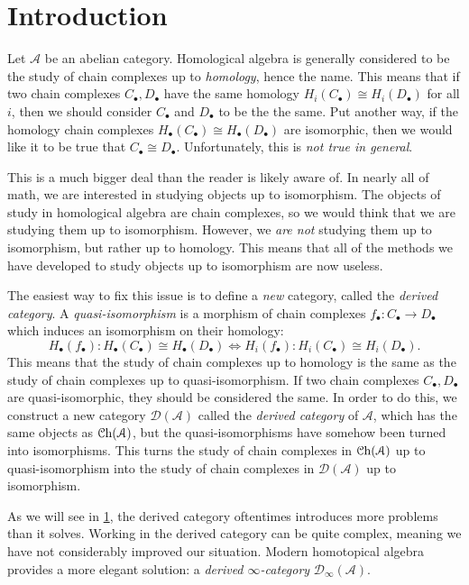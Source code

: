 \section{Introduction}\label{sec2}

Let $\mathcal{A} $ be an abelian category. Homological algebra is generally considered to be the study of chain complexes up to \emph{homology}, hence the name. This means that if two chain complexes $C_{\bullet} ,D_{\bullet} $ have the same homology $H_i(C_{\bullet} )\cong H_i(D_{\bullet} )$ for all $i$, then we should consider $C_{\bullet} $ and $D_{\bullet} $ to be the the same. Put another way, if the homology chain complexes $H_{\bullet} (C_{\bullet} )\cong H_{\bullet} (D_{\bullet} )$ are isomorphic, then we would like it to be true that $C_{\bullet} \cong D_{\bullet} $. Unfortunately, this is \emph{not true in general}.

This is a much bigger deal than the reader is likely aware of. In nearly all of math, we are interested in studying objects up to isomorphism. The objects of study in homological algebra are chain complexes, so we would think that we are studying them up to isomorphism. However, we \emph{are not} studying them up to isomorphism, but rather up to homology. This means that all of the methods we have developed to study objects up to isomorphism are now useless.

The easiest way to fix this issue is to define a \emph{new} category, called the \emph{derived category}. A \emph{quasi-isomorphism} is a morphism of chain complexes $f_{\bullet} : C_{\bullet}  \to D_{\bullet} $ which induces an isomorphism on their homology:
\[
	H_{\bullet} (f_{\bullet} ): H_{\bullet} (C_{\bullet} )\cong H_{\bullet} (D_{\bullet} ) \iff H_i(f_{\bullet} ) : H_i(C _{\bullet} )\cong H_i(D_{\bullet} )
.\]
This means that the study of chain complexes up to homology is the same as the study of chain complexes up to quasi-isomorphism. If two chain complexes $C_{\bullet} ,D_{\bullet} $ are quasi-isomorphic, they should be considered the same. In order to do this, we construct a new category $\mathcal{D} (\mathcal{A} )$ called the \emph{derived category} of $\mathcal{A} $, which has the same objects as $\mathcal{C}\mathrm{h}(\mathcal{A} ) $, but the quasi-isomorphisms have somehow been turned into isomorphisms. This turns the study of chain complexes in $\mathcal{C}\mathrm{h}(\mathcal{A} ) $ up to quasi-isomorphism into the study of chain complexes in $\mathcal{D} (\mathcal{A} )$ up to isomorphism.

As we will see in \cref{sec2}, the derived category oftentimes introduces more problems than it solves. Working in the derived category can be quite complex, meaning we have not considerably improved our situation. Modern homotopical algebra provides a more elegant solution: a \emph{derived $\infty $-category} $\mathcal{D} _{\infty } (\mathcal{A} )$.

